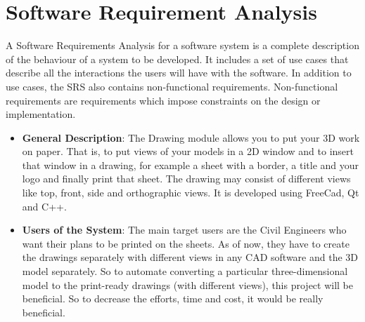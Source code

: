 
\section{Software Requirement Analysis}
A Software Requirements Analysis for a software system is a complete 
description of the behaviour of a system to be developed. It includes 
a set of use cases that describe all the interactions the users will 
have with the software. In addition to use cases, the SRS also contains 
non-functional requirements. Non-functional requirements are 
requirements which impose constraints on the design or implementation.
\begin{itemize}
\item{\bf General Description}: The Drawing module allows you to put your 3D work on paper. That is, to put views of your models in a 2D window and to insert that window in a drawing, for example a sheet with a border, a title and your logo and finally print that sheet. The drawing may consist of different views like top, front, side and orthographic views. It is developed using FreeCad, Qt and C++.
\item{\bf Users of the System}: The main target users are the Civil Engineers who want their plans to be printed on the sheets.
As of now, they have to create the drawings separately with different views in any CAD software
and the 3D model separately. So to automate converting a particular three-dimensional model to
the print-ready drawings (with different views), this project will be beneficial. So to decrease the
efforts, time and cost, it would be really beneficial.
\end{itemize}
